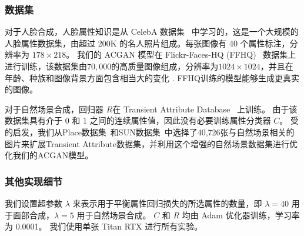 \subsubsection{数据集}
对于人脸合成，人脸属性知识是从 CelebA 数据集~\cite{celeba} 中学习的，这是一个大规模的人脸属性数据集，由超过 200K 的名人照片组成。每张图像有 40 个属性标注，分辨率为 $178\times218$。 我们的 ACGAN 模型在 Flickr-Faces-HQ (FFHQ)~\cite{stylegan} 数据集上进行训练，该数据集由$70,000$的高质量图像组成，分辨率为$1024\times1024$，并且在年龄、种族和图像背景方面包含相当大的变化 . FFHQ训练的模型能够生成更真实的图像。

对于自然场景合成，回归器 $R$在 Transient Attribute Database~\cite{scenedataset} 上训练。 由于该数据集具有介于 $0$ 和 $1$ 之间的连续属性值，因此没有必要训练属性分类器 $C$。 受\cite{iclr2021}的启发，我们从Place数据集~\cite{place}和SUN数据集~\cite{sun}中选择了40,726张与自然场景相关的图片来扩展Transient Attribute数据集，并利用这个增强的自然场景数据集进行优化我们的ACGAN模型。


\subsubsection{其他实现细节}
我们设置超参数 $\lambda$ 来表示用于平衡属性回归损失的所选属性的数量，即 $\lambda=40$ 用于面部合成，$\lambda=5$ 用于自然场景合成。 $C$ 和 $R$ 均由 Adam 优化器训练，学习率为 0.0001。 我们使用单张 Titan RTX 进行所有实验。

